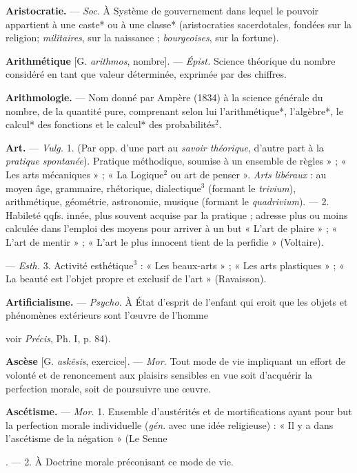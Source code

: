 \begin{itemize}[leftmargin=1cm, label=, itemsep=1pt]
{{{{\item {\bf Aristocratie.} — \textsf{\textit {Soc.}} À Système de
gouvernement dans lequel le pouvoir appartient à une caste* ou à une
classe* (aristocraties sacerdotales,
fondées sur la religion; {\it militaires},
sur la naissance ; {\it bourgeoises}, sur la
fortune).

\item {\bf Arithmétique} [G. {\it arithmos}, nombre].
— \textsf{\textit {Épist.}} Science théorique du
nombre considéré en tant que valeur
déterminée, exprimée par des chiffres.

\item {\bf Arithmologie.} — Nom donné par Ampère (1834) à la science générale du
nombre, de la quantité pure, comprenant selon lui l’arithmétique*,
l’algèbre*, le calcul* des fonctions
et le calcul* des probabilités$^2$.

\item {\bf Art.} — \textsf{\textit {Vulg.}} 1. (Par opp. d’une part
au {\it savoir théorique}, d’autre part à la
{\it pratique spontanée}). Pratique méthodique, soumise à un ensemble de
règles » ; « Les arts mécaniques » ;
« La Logique$^2$ ou art de penser ».
{\it Arts libéraux} : au moyen âge, grammaire,
rhétorique, dialectique$^3$ (formant le {\it trivium}), arithmétique, géométrie,
astronomie, musique (formant le {\it quadrivium}). — 2. Habileté
qqfs. innée, plus souvent acquise
par la pratique ; adresse plus ou
moins calculée dans l'emploi des
moyens pour arriver à un but
« L'art de plaire » ; « L'art de mentir » ;
« L'art le plus innocent tient de la
perfidie » (Voltaire).

— \textsf{\textit {Esth.}} 3. Activité esthétique$^3$ :
« Les beaux-arts » ; « Les arts plastiques » ; « La beauté est l’objet
propre et exclusif de l’art » (Ravaisson).

\item {\bf Artificialisme.} — \textsf{\textit {Psycho.}} À État d'esprit
de l'enfant qui eroit que les objets
et phénomènes extérieurs sont l'œuvre de l’homme {voir {\it Précis}, Ph. I,
p. 84).

\item {\bf Ascèse} [G. {\it askêsis}, exercice]. — \textsf{\textit {Mor.}}
Tout mode de vie impliquant un
effort de volonté et de renoncement
aux plaisirs sensibles en vue soit
d'acquérir la perfection morale, soit
de poursuivre une œuvre.

\item {\bf Ascétisme.} — \textsf{\textit {Mor.}} 1. Ensemble d’austérités et de mortifications ayant
pour but la perfection morale individuelle ({\it gén}. avec une idée
religieuse) : « Il y a dans l’ascétisme de
la négation » (Le Senne}. — 2. À
Doctrine morale préconisant ce
mode de vie.

}}}}
\end{itemize}
